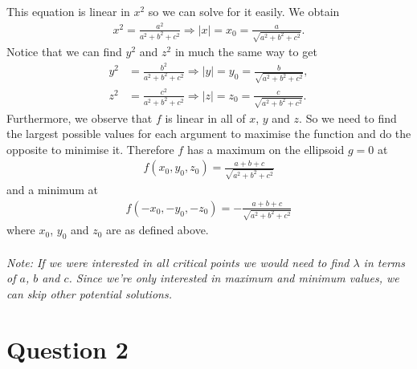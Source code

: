 \documentclass{article}
\begin{document}
This equation is linear in $x^2$ so we can solve for it easily. We obtain
\begin{align*}
  x^2=\frac{a^2}{a^2+b^2+c^2} \Rightarrow |x|=x_0=\frac{a}{\sqrt{a^2+b^2+c^2}}.
\end{align*}
Notice that we can find $y^2$ and $z^2$ in much the same way to get
\begin{align*}
  y^2&=\frac{b^2}{a^2+b^2+c^2}\Rightarrow |y|=y_0=\frac{b}{\sqrt{a^2+b^2+c^2}},\\
  z^2&=\frac{c^2}{a^2+b^2+c^2}\Rightarrow |z|=z_0=\frac{c}{\sqrt{a^2+b^2+c^2}}.
\end{align*}
Furthermore, we observe that $f$ is linear in all of $x$, $y$ and $z$.
So we need to find the largest possible values for each argument to maximise
the function and do the opposite to minimise it. Therefore $f$ has a maximum
on the ellipsoid $g=0$ at
\begin{align*}
  f(x_0,y_0,z_0) = \frac{a+b+c}{\sqrt{a^2+b^2+c^2}}
\end{align*}
and a minimum at
\begin{align*}
  f(-x_0, -y_0, -z_0) = -\frac{a+b+c}{\sqrt{a^2+b^2+c^2}}
\end{align*}
where $x_0$, $y_0$ and $z_0$ are as defined above.\\\\
\emph{Note: If we were interested in all critical points we would need to find
$\lambda$ in terms of $a$, $b$ and $c$. Since we're only interested in maximum
and minimum values, we can skip other potential solutions.}


\section*{Question 2}
\end{document}
